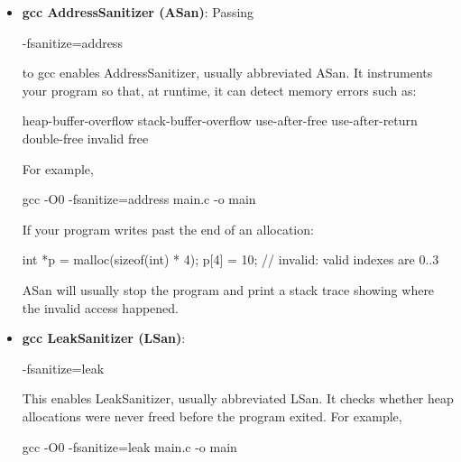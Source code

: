 \documentclass{report}
\begin{document}
        \pagebreak 
        \begin{itemize}
            \item \textbf{gcc AddressSanitizer (ASan)}: Passing
                \bigbreak \noindent 
                \begin{bashcode}
                -fsanitize=address
                \end{bashcode}
                \bigbreak \noindent 
                to gcc enables AddressSanitizer, usually abbreviated ASan. It instruments your program so that, at runtime, it can detect memory errors such as:
                \bigbreak \noindent 
                \begin{cppcode}
                    heap-buffer-overflow
                    stack-buffer-overflow
                    use-after-free
                    use-after-return
                    double-free
                    invalid free
                \end{cppcode}
                \bigbreak \noindent 
                For example, 
                \bigbreak \noindent 
                \begin{bashcode}
                    gcc -O0 -fsanitize=address main.c -o main
                \end{bashcode}
                \bigbreak \noindent 
                If your program writes past the end of an allocation:
                \bigbreak \noindent 
                \begin{cppcode}
                    int *p = malloc(sizeof(int) * 4);
                    p[4] = 10;   // invalid: valid indexes are 0..3
                \end{cppcode}
                \bigbreak \noindent 
                ASan will usually stop the program and print a stack trace showing where the invalid access happened.
            \item \textbf{gcc LeakSanitizer (LSan)}: 
                \bigbreak \noindent 
                \begin{cppcode}
                -fsanitize=leak
                \end{cppcode}
                \bigbreak \noindent 
                This enables LeakSanitizer, usually abbreviated LSan. It checks whether heap allocations were never freed before the program exited.
                \bigbreak \noindent 
                For example,
                \bigbreak \noindent 
                \begin{bashcode}
                gcc -O0 -fsanitize=leak main.c -o main

\end{bashcode}
\end{itemize}
\end{document}
